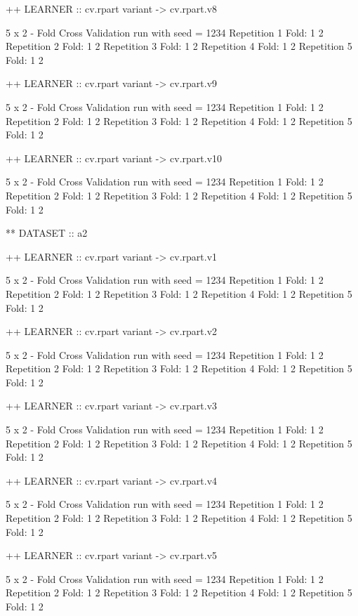 \documentclass{article}
\begin{document}
\begin{Schunk}
\begin{Soutput}
++ LEARNER :: cv.rpart  variant ->  cv.rpart.v8 

 5 x 2 - Fold Cross Validation run with seed =  1234 
Repetition  1 
Fold:  1  2
Repetition  2 
Fold:  1  2
Repetition  3 
Fold:  1  2
Repetition  4 
Fold:  1  2
Repetition  5 
Fold:  1  2


++ LEARNER :: cv.rpart  variant ->  cv.rpart.v9 

 5 x 2 - Fold Cross Validation run with seed =  1234 
Repetition  1 
Fold:  1  2
Repetition  2 
Fold:  1  2
Repetition  3 
Fold:  1  2
Repetition  4 
Fold:  1  2
Repetition  5 
Fold:  1  2


++ LEARNER :: cv.rpart  variant ->  cv.rpart.v10 

 5 x 2 - Fold Cross Validation run with seed =  1234 
Repetition  1 
Fold:  1  2
Repetition  2 
Fold:  1  2
Repetition  3 
Fold:  1  2
Repetition  4 
Fold:  1  2
Repetition  5 
Fold:  1  2


** DATASET :: a2

++ LEARNER :: cv.rpart  variant ->  cv.rpart.v1 

 5 x 2 - Fold Cross Validation run with seed =  1234 
Repetition  1 
Fold:  1  2
Repetition  2 
Fold:  1  2
Repetition  3 
Fold:  1  2
Repetition  4 
Fold:  1  2
Repetition  5 
Fold:  1  2


++ LEARNER :: cv.rpart  variant ->  cv.rpart.v2 

 5 x 2 - Fold Cross Validation run with seed =  1234 
Repetition  1 
Fold:  1  2
Repetition  2 
Fold:  1  2
Repetition  3 
Fold:  1  2
Repetition  4 
Fold:  1  2
Repetition  5 
Fold:  1  2


++ LEARNER :: cv.rpart  variant ->  cv.rpart.v3 

 5 x 2 - Fold Cross Validation run with seed =  1234 
Repetition  1 
Fold:  1  2
Repetition  2 
Fold:  1  2
Repetition  3 
Fold:  1  2
Repetition  4 
Fold:  1  2
Repetition  5 
Fold:  1  2


++ LEARNER :: cv.rpart  variant ->  cv.rpart.v4 

 5 x 2 - Fold Cross Validation run with seed =  1234 
Repetition  1 
Fold:  1  2
Repetition  2 
Fold:  1  2
Repetition  3 
Fold:  1  2
Repetition  4 
Fold:  1  2
Repetition  5 
Fold:  1  2


++ LEARNER :: cv.rpart  variant ->  cv.rpart.v5 

 5 x 2 - Fold Cross Validation run with seed =  1234 
Repetition  1 
Fold:  1  2
Repetition  2 
Fold:  1  2
Repetition  3 
Fold:  1  2
Repetition  4 
Fold:  1  2
Repetition  5 
Fold:  1  2



\end{Soutput}
\end{Schunk}
\end{document}
